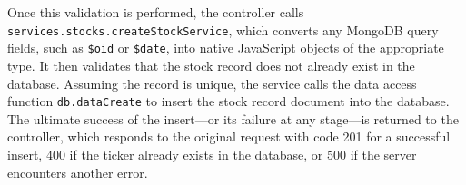 \documentclass[
11pt,
titlepage,
]{article}
\begin{document}
Once this validation is performed, the controller calls
\texttt{services.stocks.createStockService}, which converts any MongoDB query
fields, such as \texttt{\$oid} or \texttt{\$date}, into native JavaScript
objects of the appropriate type. It then validates that the stock record does
not already exist in the database. Assuming the record is unique, the service
calls the data access function \texttt{db.dataCreate} to insert the stock record
document into the database. The ultimate success of the insert---or its failure
at any stage---is returned to the controller, which responds to the original
request with code 201 for a successful insert, 400 if the ticker already exists
in the database, or 500 if the server encounters another error.
\end{document}

